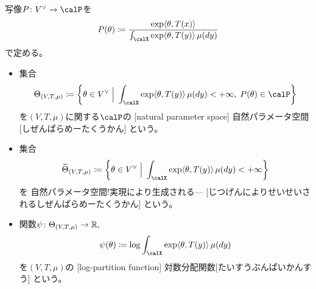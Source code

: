 \documentclass[report]{jlreq}
\begin{document}
\begin{definition}[自然パラメータ空間]
    写像$P \colon V^\vee \to \calP$を
    \begin{equation}
        P(\theta)
            \coloneqq
                \frac{
                    \exp \langle \theta, T(x) \rangle
                }{
                    \int_\calX \exp \langle \theta, T(y) \rangle \, \mu(dy)
                }
    \end{equation}
    で定める。
    \begin{itemize}
        \item 集合
            \begin{equation}
                \Theta_{(V, T, \mu)}
                    \coloneqq \mybrace{
                        \theta \in V^\vee
                        \;\Big|\;
                        \int_\calX
                            \exp \langle \theta, T(y) \rangle \, \mu(dy)
                            < +\infty, \;
                        P(\theta) \in \calP
                    }
            \end{equation}
            を$(V, T, \mu)$に関する$\calP$の
            [natural parameter space]
                {自然パラメータ空間}[しぜんぱらめーたくうかん]
            という。
        \item 集合
            \begin{equation}
                \wt{\Theta}_{(V, T, \mu)}
                    \coloneqq
                        \mybrace{
                            \theta \in V^\vee
                            \;\Big|\;
                            \int_\calX
                                \exp \langle \theta, T(y) \rangle \, \mu(dy)
                                < +\infty
                        }
            \end{equation}
            を
                {自然パラメータ空間!実現により生成される---}
                [じつげんによりせいせいされるしぜんぱらめーたくうかん]
            という。
        \item 関数$\psi \colon \Theta_{(V, T, \mu)} \to \mathbb{R},$
            \begin{equation}
                \psi(\theta)
                    \coloneqq
                    \log \int_\calX \exp \langle \theta, T(y) \rangle \, \mu(dy)
            \end{equation}
            を$(V, T, \mu)$の
            [log-partition function]
                {対数分配関数}[たいすうぶんぱいかんすう]
            という。
    \end{itemize}
\end{definition}
\end{document}
